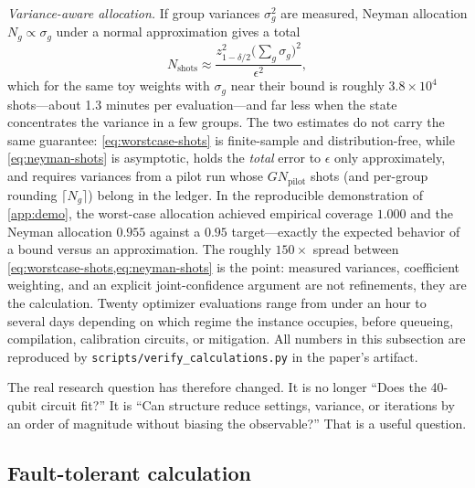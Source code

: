 \emph{Variance-aware allocation.} If group variances $\sigma_g^2$ are measured, Neyman allocation $N_g\propto\sigma_g$ under a normal approximation gives a total
\begin{equation}
N_{\mathrm{shots}}\approx
\frac{z_{1-\delta/2}^{2}\bigl(\sum_g \sigma_g\bigr)^2}{\epsilon^2},
\label{eq:neyman-shots}
\end{equation}
which for the same toy weights with $\sigma_g$ near their bound is roughly $3.8\times10^{4}$ shots---about 1.3 minutes per evaluation---and far less when the state concentrates the variance in a few groups. The two estimates do not carry the same guarantee: \cref{eq:worstcase-shots} is finite-sample and distribution-free, while \cref{eq:neyman-shots} is asymptotic, holds the \emph{total} error to $\epsilon$ only approximately, and requires variances from a pilot run whose $G N_{\mathrm{pilot}}$ shots (and per-group rounding $\lceil N_g\rceil$) belong in the ledger. In the reproducible demonstration of \cref{app:demo}, the worst-case allocation achieved empirical coverage $1.000$ and the Neyman allocation $0.955$ against a $0.95$ target---exactly the expected behavior of a bound versus an approximation. The roughly $150\times$ spread between \cref{eq:worstcase-shots,eq:neyman-shots} is the point: measured variances, coefficient weighting, and an explicit joint-confidence argument are not refinements, they are the calculation. Twenty optimizer evaluations range from under an hour to several days depending on which regime the instance occupies, before queueing, compilation, calibration circuits, or mitigation. All numbers in this subsection are reproduced by \texttt{scripts/verify\_calculations.py} in the paper's artifact.

The real research question has therefore changed. It is no longer ``Does the 40-qubit circuit fit?'' It is ``Can structure reduce settings, variance, or iterations by an order of magnitude without biasing the observable?'' That is a useful question.

\subsection{Fault-tolerant calculation}

